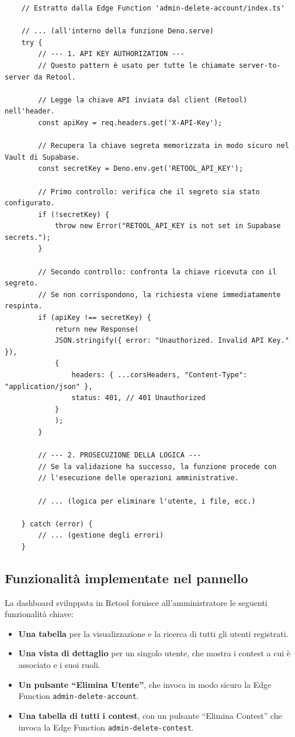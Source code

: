 \begin{longlisting}
    \begin{verbatim}
    // Estratto dalla Edge Function 'admin-delete-account/index.ts'

	// ... (all'interno della funzione Deno.serve)
	try {
		// --- 1. API KEY AUTHORIZATION ---
		// Questo pattern è usato per tutte le chiamate server-to-server da Retool.

		// Legge la chiave API inviata dal client (Retool) nell'header.
		const apiKey = req.headers.get('X-API-Key');

		// Recupera la chiave segreta memorizzata in modo sicuro nel Vault di Supabase.
		const secretKey = Deno.env.get('RETOOL_API_KEY');

		// Primo controllo: verifica che il segreto sia stato configurato.
		if (!secretKey) {
			throw new Error("RETOOL_API_KEY is not set in Supabase secrets.");
		}

		// Secondo controllo: confronta la chiave ricevuta con il segreto.
		// Se non corrispondono, la richiesta viene immediatamente respinta.
		if (apiKey !== secretKey) {
			return new Response(
			JSON.stringify({ error: "Unauthorized. Invalid API Key." }),
			{
				headers: { ...corsHeaders, "Content-Type": "application/json" },
				status: 401, // 401 Unauthorized
			}
			);
		}

		// --- 2. PROSECUZIONE DELLA LOGICA ---
		// Se la validazione ha successo, la funzione procede con
		// l'esecuzione delle operazioni amministrative.

		// ... (logica per eliminare l'utente, i file, ecc.)

	} catch (error) {
		// ... (gestione degli errori)
	}
    \end{verbatim}
    \caption{Validazione della chiave API all'interno di una Edge Function amministrativa.}
    \label{lst:api_key_validation}
\end{longlisting}


\subsection{Funzionalità implementate nel pannello}\label{subsec:funzionalita-implementate-nel-pannello}
La dashboard sviluppata in Retool fornisce all'amministratore le seguenti funzionalità chiave:
\begin{itemize}
    \item \textbf{Una tabella} per la visualizzazione e la ricerca di tutti gli utenti registrati.
    \item \textbf{Una vista di dettaglio} per un singolo utente, che mostra i contest a cui è associato e i suoi ruoli.
    \item \textbf{Un pulsante ``Elimina Utente''}, che invoca in modo sicuro la Edge Function \texttt{admin-delete-account}.
    \item \textbf{Una tabella di tutti i contest}, con un pulsante ``Elimina Contest'' che invoca la Edge Function \texttt{admin-delete-contest}.
\end{itemize}